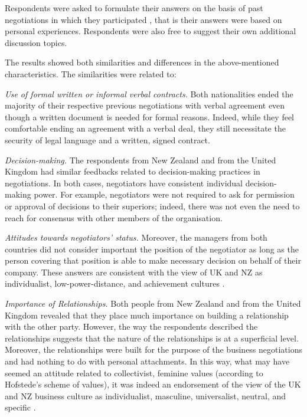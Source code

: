 \documentclass[../main.tex]{subfiles}
\begin{document}
Respondents were asked to formulate their answers on the basis of past negotiations in which they participated \autocite[10]{zueva}, that is their answers were based on personal experiences. Respondents were also free to suggest their own additional discussion topics.

The results showed both similarities and differences in the above-mentioned characteristics. The similarities were related to:

\textit{Use of formal written or informal verbal contracts.} Both nationalities ended the majority of their respective previous negotiations with verbal agreement even though a written document is needed for formal reasons. Indeed, while they feel comfortable ending an agreement with a verbal deal, they still necessitate the security of legal language and a written, signed contract.

\textit{Decision-making.} The respondents from New Zealand and from the United Kingdom had similar feedbacks related to decision-making practices in negotiations. In both cases, negotiators have consistent individual decision-making power. For example, negotiators were not required to ask for permission or approval of decisions to their superiors; indeed, there was not even the need to reach for consensus with other members of the organisation.

\textit{Attitudes towards negotiators’ status.} Moreover, the managers from both countries did not consider important the position of the negotiator as long as the person covering that position is able to make necessary decision on behalf of their company. These answers are consistent with the view of UK and NZ as individualist, low-power-distance, and achievement cultures \autocite[12]{zueva}.

\textit{Importance of Relationships.} Both people from New Zealand and from the United Kingdom revealed that they place much importance on building a relationship with the other party. However, the way the respondents described the relationships suggests that the nature of the relationships is at a superficial level. Moreover, the relationships were built for the purpose of the business negotiations and had nothing to do with personal attachments. In this way, what may have seemed an attitude related to collectivist, feminine values (according to Hofstede's scheme of values), it was indeed an endorsement of the view of the UK and NZ business culture as individualist, masculine, universalist, neutral, and specific \mancite\autocite[12]{zueva}.
\end{document}
